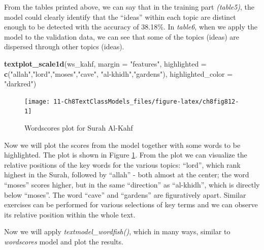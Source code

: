 \documentclass[
]{article}
\newenvironment{Shaded}{\begin{snugshade}}{\end{snugshade}}
\newcommand{\AttributeTok}[1]{\textcolor[rgb]{0.13,0.29,0.53}{#1}}
\newcommand{\FunctionTok}[1]{\textcolor[rgb]{0.13,0.29,0.53}{\textbf{#1}}}
\newcommand{\NormalTok}[1]{#1}
\newcommand{\StringTok}[1]{\textcolor[rgb]{0.31,0.60,0.02}{#1}}
\begin{document}
\normalsize

From the tables printed above, we can say that in the training part \emph{(table5)}, the model could clearly identify that the ``ideas'' within each topic are distinct enough to be detected with the accuracy of 38.18\%. In \emph{table6}, when we apply the model to the validation data, we can see that some of the topics (ideas) are dispersed through other topics (ideas).

\begin{Shaded}
\begin{Highlighting}[]
\FunctionTok{textplot\_scale1d}\NormalTok{(ws\_kahf, }\AttributeTok{margin =} \StringTok{"features"}\NormalTok{,}
                 \AttributeTok{highlighted =} \FunctionTok{c}\NormalTok{(}\StringTok{"allah"}\NormalTok{,}\StringTok{"lord"}\NormalTok{,}\StringTok{"moses"}\NormalTok{,}\StringTok{"cave"}\NormalTok{,}
                                 \StringTok{"al{-}khidh"}\NormalTok{,}\StringTok{"gardens"}\NormalTok{),}
                 \AttributeTok{highlighted\_color =} \StringTok{"darkred"}\NormalTok{)}
\end{Highlighting}
\end{Shaded}

\begin{figure}

{\centering \texttt{[image: 11-Ch8TextClassModels\_files/figure-latex/ch8fig812-1]} 

}

\caption{Wordscores plot for Surah Al-Kahf}\label{fig:ch8fig812}
\end{figure}

Now we will plot the scores from the model together with some words to be highlighted. The plot is shown in Figure \ref{fig:ch8fig812}. From the plot we can visualize the relative positions of the key words for the various topics: ``lord'', which rank highest in the Surah, followed by ``allah'' - both almost at the center; the word ``moses'' scores higher, but in the same ``direction'' as ``al-khidh'', which is directly below ``moses''. The word ``cave'' and ``gardens'' are figuratively apart. Similar exercises can be performed for various selections of key terms and we can observe its relative position within the whole text.

Now we will apply \emph{textmodel\_wordfish()}, which in many ways, similar to \emph{wordscores} model and plot the results.
\end{document}
